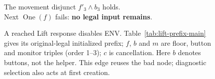 \begin{figure}[!ht]
\centering
{}\par\medskip
\small The movement disjunct $f'_3\land b_3$ holds.\\
Next $\operatorname{One}(f)$ fails: \textbf{no legal input remains}.
\caption{A reached Lift response disables ENV.
Table~\ref{tab:lift-prefix-main} gives its original-legal initialized prefix;
$f$, $b$ and $m$ are floor, button and monitor triples (order 1--3);
$c$ is cancellation. Here $b$ denotes buttons, not the helper.
This edge reuses the bad node; diagnostic
selection also acts at first creation.}
\label{fig:lift-admission}
\end{figure}
